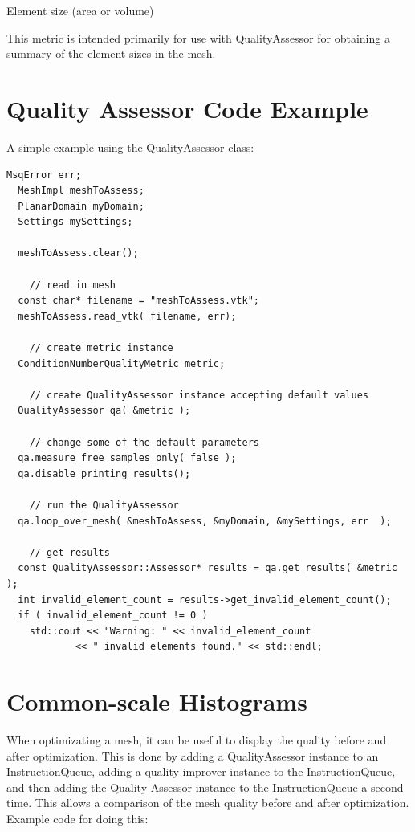 Element size (area or volume)

This metric is intended primarily for use with QualityAssessor for obtaining a summary of the element sizes in the mesh.



\clearpage
\section{Quality Assessor Code Example}

A simple example using the QualityAssessor class:

\begin{lstlisting}[frame=single]
  MsqError err;
  MeshImpl meshToAssess;
  PlanarDomain myDomain;
  Settings mySettings;

  meshToAssess.clear();

    // read in mesh
  const char* filename = "meshToAssess.vtk";
  meshToAssess.read_vtk( filename, err);

    // create metric instance
  ConditionNumberQualityMetric metric;

    // create QualityAssessor instance accepting default values
  QualityAssessor qa( &metric );

    // change some of the default parameters
  qa.measure_free_samples_only( false );
  qa.disable_printing_results();

    // run the QualityAssessor
  qa.loop_over_mesh( &meshToAssess, &myDomain, &mySettings, err	 );

    // get results
  const QualityAssessor::Assessor* results = qa.get_results( &metric );
  int invalid_element_count = results->get_invalid_element_count();
  if ( invalid_element_count != 0 )
    std::cout << "Warning: " << invalid_element_count
			<< " invalid elements found." << std::endl;
\end{lstlisting}

\section{Common-scale Histograms}

When optimizating a mesh, it can be useful to display the quality before and after optimization.  This is done by adding a QualityAssessor instance to an InstructionQueue, adding a quality improver instance to the InstructionQueue, and then adding the Quality Assessor instance to the InstructionQueue a second time.  This allows a comparison of the mesh quality before and after optimization.  Example code for doing this:

